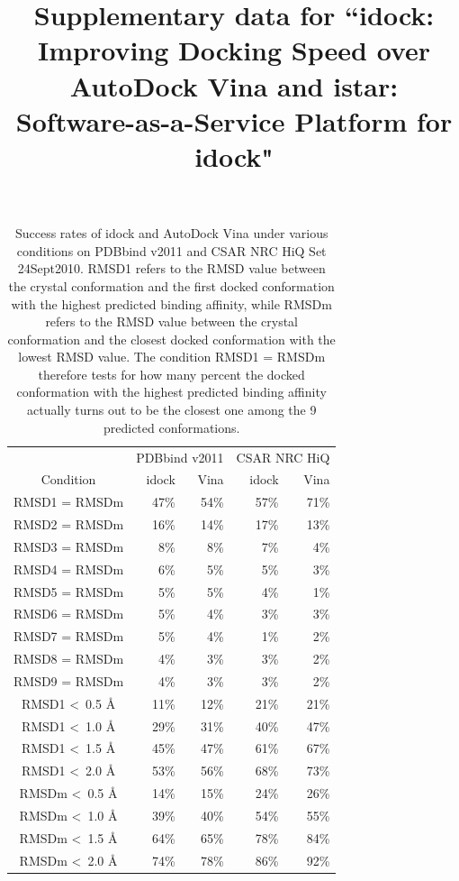 \documentclass[10pt]{article}
\title{Supplementary data for ``idock: Improving Docking Speed over AutoDock Vina and istar: Software-as-a-Service Platform for idock"}
\begin{document}
\maketitle

\pagebreak
\begin{table}
\centering
\begin{tabular*}
{\linewidth}
{@{\extracolsep{\fill}}crrrr}
\toprule
& \multicolumn{2}{c}{PDBbind v2011} & \multicolumn{2}{c}{CSAR NRC HiQ}\\
Condition & idock & Vina & idock & Vina\\
\midrule
RMSD1 = RMSDm           & 47\% & 54\% & 57\% & 71\%\\
RMSD2 = RMSDm           & 16\% & 14\% & 17\% & 13\%\\
RMSD3 = RMSDm           &  8\% &  8\% &  7\% &  4\%\\
RMSD4 = RMSDm           &  6\% &  5\% &  5\% &  3\%\\
RMSD5 = RMSDm           &  5\% &  5\% &  4\% &  1\%\\
RMSD6 = RMSDm           &  5\% &  4\% &  3\% &  3\%\\
RMSD7 = RMSDm           &  5\% &  4\% &  1\% &  2\%\\
RMSD8 = RMSDm           &  4\% &  3\% &  3\% &  2\%\\
RMSD9 = RMSDm           &  4\% &  3\% &  3\% &  2\%\\
\noalign{\smallskip}
RMSD1 \textless\ 0.5 \AA & 11\% & 12\% & 21\% & 21\%\\
RMSD1 \textless\ 1.0 \AA & 29\% & 31\% & 40\% & 47\%\\
RMSD1 \textless\ 1.5 \AA & 45\% & 47\% & 61\% & 67\%\\
RMSD1 \textless\ 2.0 \AA & 53\% & 56\% & 68\% & 73\%\\
\noalign{\smallskip}
RMSDm \textless\ 0.5 \AA & 14\% & 15\% & 24\% & 26\%\\
RMSDm \textless\ 1.0 \AA & 39\% & 40\% & 54\% & 55\%\\
RMSDm \textless\ 1.5 \AA & 64\% & 65\% & 78\% & 84\%\\
RMSDm \textless\ 2.0 \AA & 74\% & 78\% & 86\% & 92\%\\
\bottomrule
\end{tabular*}
\caption{Success rates of idock and AutoDock Vina under various conditions on PDBbind v2011 and CSAR NRC HiQ Set 24Sept2010. RMSD1 refers to the RMSD value between the crystal conformation and the first docked conformation with the highest predicted binding affinity, while RMSDm refers to the RMSD value between the crystal conformation and the closest docked conformation with the lowest RMSD value. The condition RMSD1 = RMSDm therefore tests for how many percent the docked conformation with the highest predicted binding affinity actually turns out to be the closest one among the 9 predicted conformations.}
\label{idock:SuccessRate}
\end{table}
\end{document}
